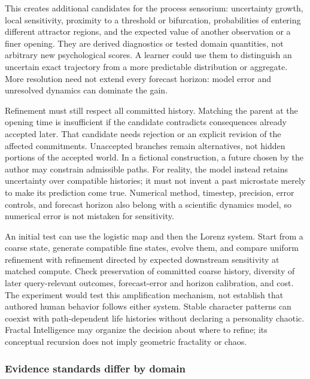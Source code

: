 \documentclass[10pt]{article}
\begin{document}
This creates additional candidates for the process sensorium: uncertainty
growth, local sensitivity, proximity to a threshold or bifurcation,
probabilities of entering different attractor regions, and the expected value
of another observation or a finer opening. They are derived diagnostics or
tested domain quantities, not arbitrary new psychological scores. A learner
could use them to distinguish an uncertain exact trajectory from a more
predictable distribution or aggregate. More resolution need not extend every
forecast horizon: model error and unresolved dynamics can dominate the gain.

Refinement must still respect all committed history. Matching the parent at
the opening time is insufficient if the candidate contradicts consequences
already accepted later. That candidate needs rejection or an explicit revision
of the affected commitments. Unaccepted branches remain alternatives, not
hidden portions of the accepted world. In a fictional construction, a future
chosen by the author may constrain admissible paths. For reality, the model
instead retains uncertainty over compatible histories; it must not invent a
past microstate merely to make its prediction come true. Numerical method,
timestep, precision, error controls, and forecast horizon also belong with a
scientific dynamics model, so numerical error is not mistaken for sensitivity.

An initial test can use the logistic map and then the Lorenz system. Start
from a coarse state, generate compatible fine states, evolve them, and compare
uniform refinement with refinement directed by expected downstream sensitivity
at matched compute. Check preservation of committed coarse history, diversity
of later query-relevant outcomes, forecast-error and horizon calibration, and
cost. The experiment would test this amplification mechanism, not establish
that authored human behavior follows either system. Stable character patterns
can coexist with path-dependent life histories without declaring a personality
chaotic. Fractal Intelligence may organize the decision about where to refine;
its conceptual recursion does not imply geometric fractality or chaos.

\subsubsection{Evidence standards differ by domain}
\end{document}
